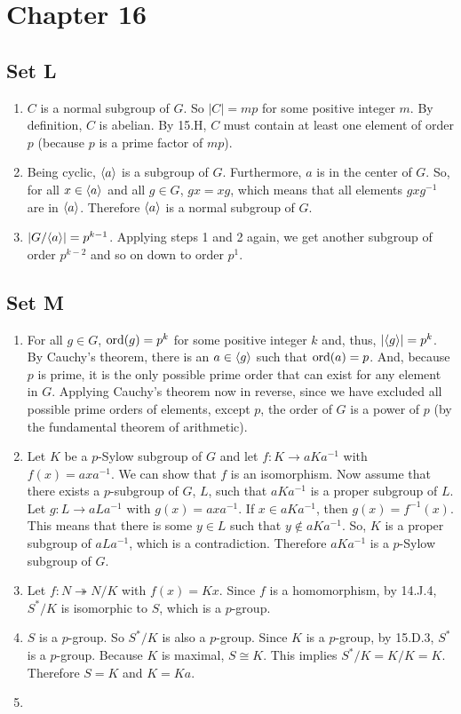 \section{Chapter 16}
\subsection{Set L}
\begin{enumerate}
    \item $C$ is a normal subgroup of $G$. So $|C| = mp$ for some positive integer $m$. By definition, $C$ is abelian. By 15.H, $C$ must contain at least one element of order $p$ (because $p$ is a prime factor of $mp$).
    \item Being cyclic, $\langle a\rangle$ is a subgroup of $G$. Furthermore, $a$ is in the center of $G$. So, for all $x \in \langle a\rangle$ and all $g \in G$, $gx = xg$, which means that all elements $gxg^{-1}$ are in $\langle a\rangle$.  Therefore $\langle a\rangle$ is a normal subgroup of $G$.
    \item $|G/\langle a\rangle| = p^{k - 1}$. Applying steps 1 and 2 again, we get another subgroup of order $p^{k - 2}$ and so on down to order $p^1$.
\end{enumerate}

\subsection{Set M}
\begin{enumerate}
    \item For all $g \in G$, $\operatorname{ord}(g) = p^k$ for some positive integer $k$ and, thus, $|\langle g\rangle| = p^k$. By Cauchy's theorem, there is an $a \in \langle g\rangle$ such that $\operatorname{ord}(a) = p$. And, because $p$ is prime, it is the only possible prime order that can exist for any element in $G$. Applying Cauchy's theorem now in reverse, since we have excluded all possible prime orders of elements, except $p$, the order of $G$ is a power of $p$ (by the fundamental theorem of arithmetic).

    \item Let $K$ be a $p$-Sylow subgroup of $G$ and let $f : K \to aKa^{-1}$ with $f(x) = axa^{-1}$. We can show that $f$ is an isomorphism. Now assume that there exists a $p$-subgroup of $G$, $L$, such that $aKa^{-1}$ is a proper subgroup of $L$. Let $g : L \to aLa^{-1}$ with $g(x) = axa^{-1}$. If $x \in aKa^{-1}$, then $g(x) = f^{-1}(x)$. This means that there is some $y \in L$ such that $y \notin aKa^{-1}$. So, $K$ is a proper subgroup of $aL a^{-1}$, which is a contradiction. Therefore $aKa^{-1}$ is a $p$-Sylow subgroup of $G$.
    
    \item Let $f : N \twoheadrightarrow N / K$ with $f(x) = Kx$. Since $f$ is a homomorphism, by 14.J.4, $S^* / K$ is isomorphic to $S$, which is a $p$-group.
    
    \item  $S$ is a $p$-group. So $S^* / K$ is also a $p$-group. Since $K$ is a $p$-group, by 15.D.3, $S^*$ is a $p$-group. Because $K$ is maximal, $S \cong K$. This implies $S^* / K = K / K = K$. Therefore $S = K$ and $K = Ka$.
    \item 
\end{enumerate}
